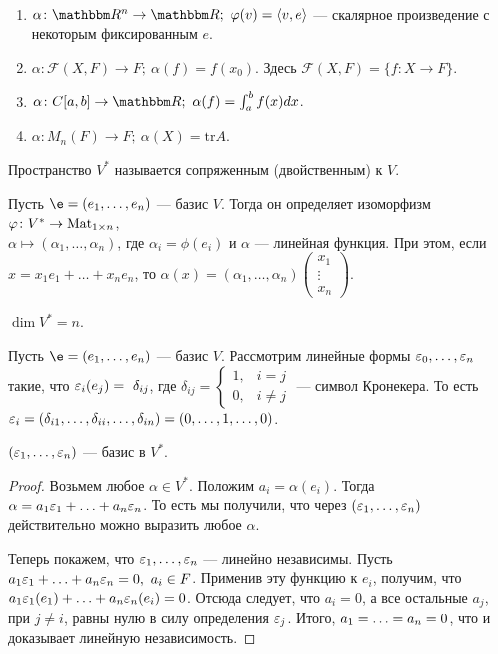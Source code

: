 \begin{Examples}\
\begin{enumerate}
\item $\alpha \colon \R^n \rightarrow \R;\ \phi(v) = \langle v, e \rangle$ --- скалярное произведение с некоторым фиксированным $e$.
\item $\alpha \colon \mathcal{F}(X, F) \rightarrow F;\ \alpha(f) = f(x_0)$. Здесь $\mathcal{F}(X, F) = \{f \colon X \rightarrow F  \}$.
\item $\alpha \colon C[a, b] \rightarrow \R;\ \alpha(f) = \int_a^b f(x) dx$.
\item $\alpha \colon M_n(F) \rightarrow F;\ \alpha(X) = \mathrm{tr}A$.
\end{enumerate}
\end{Examples}

\begin{Def}
Пространство $V^*$ называется сопряженным (двойственным) к $V$.
\end{Def}

Пусть $\e = (e_1, \ldots, e_n)$ --- базис $V$. Тогда он определяет изоморфизм $\varphi \colon V^* \to \mathrm{Mat}_{1\times n}$, \\$\alpha \mapsto (\alpha_1, \ldots, \alpha_n)$, где $\alpha_i = \phi(e_i)$ и $\alpha$ --- линейная функция. При этом, если $x = x_1e_1 + \ldots + x_ne_n$, то $\alpha(x) = (\alpha_1, \ldots, \alpha_n)\begin{pmatrix}x_1\\ \vdots \\ x_n\end{pmatrix}$.

\begin{Consequence}
$\dim V^* = n$.
\end{Consequence}

Пусть $\e = (e_1, \ldots, e_n)$ --- базис $V$. Рассмотрим линейные формы $\varepsilon_0, \ldots, \varepsilon_n$ такие, что $\varepsilon_i(e_j) =~\delta_{ij}$, где $\delta_{ij} =
\begin{cases}
1, & i = j \\
0, & i \neq j
\end{cases}
$ --- символ Кронекера. То есть $\varepsilon_i = (\delta_{i1}, \ldots, \delta_{ii}, \ldots, \delta_{in}) = (0, \ldots, 1, \ldots, 0)$.

\begin{Suggestion}
$(\varepsilon_1, \ldots, \varepsilon_n)$ --- базис в $V^*$.
\end{Suggestion}

\begin{proof}
Возьмем любое $\alpha \in V^*$. Положим $a_i = \alpha(e_i)$. Тогда $\alpha = a_1\varepsilon_1 + \ldots + a_n\varepsilon_n$. То есть мы получили, что через $(\varepsilon_1, \ldots, \varepsilon_n)$ действительно можно выразить любое $\alpha$.

Теперь покажем, что $\varepsilon_1, \ldots, \varepsilon_n$ --- линейно независимы. Пусть $a_1\varepsilon_1 + \ldots + a_n\varepsilon_n = 0,\ a_i \in F$. Применив эту функцию к $e_i$, получим, что $a_1\varepsilon_1(e_1) + \ldots + a_n\varepsilon_n(e_i) = 0$. Отсюда следует, что $a_i = 0$, а все остальные $a_j$, при $j \neq i$, равны нулю в силу определения $\varepsilon_j$. Итого, $a_1 = \ldots \hm= a_n = 0$, что и доказывает линейную независимость.
\end{proof}

